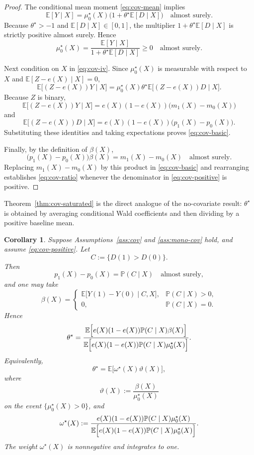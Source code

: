 \documentclass[11pt]{article}
\numberwithin{equation}{section}
\newcommand{\E}{\mathbb E}
\newcommand{\PP}{\mathbb P}
\newcommand{\1}{\mathbf 1}
\newtheorem{corollary}[assumption]{Corollary}
\theoremstyle{remark}
\begin{document}
\begin{proof}
The conditional mean moment \eqref{eq:cov-mean} implies
\[
\E[Y\mid X] = \mu_0^\star(X)\bigl(1+\theta^\star\E[D\mid X]\bigr)
\quad \text{almost surely}.
\]
Because $\theta^\star>-1$ and $\E[D\mid X]\in[0,1]$, the multiplier
$1+\theta^\star\E[D\mid X]$ is strictly positive almost surely. Hence
\[
\mu_0^\star(X)
= \frac{\E[Y\mid X]}{1+\theta^\star\E[D\mid X]} \ge 0
\quad \text{almost surely}.
\]

Next condition on $X$ in \eqref{eq:cov-iv}. Since $\mu_0^\star(X)$ is measurable with
respect to $X$ and $\E[Z-e(X)\mid X]=0$,
\[
\E\bigl[(Z-e(X))Y\mid X\bigr]
= \mu_0^\star(X)\theta^\star\E\bigl[(Z-e(X))D\mid X\bigr].
\]
Because $Z$ is binary,
\[
\E\bigl[(Z-e(X))Y\mid X\bigr] = e(X)(1-e(X))\bigl(m_1(X)-m_0(X)\bigr)
\]
and
\[
\E\bigl[(Z-e(X))D\mid X\bigr] = e(X)(1-e(X))\bigl(p_1(X)-p_0(X)\bigr).
\]
Substituting these identities and taking expectations proves \eqref{eq:cov-basic}.

Finally, by the definition of $\beta(X)$,
\[
\bigl(p_1(X)-p_0(X)\bigr)\beta(X) = m_1(X)-m_0(X)
\quad \text{almost surely}.
\]
Replacing $m_1(X)-m_0(X)$ by this product in \eqref{eq:cov-basic} and rearranging
establishes \eqref{eq:cov-ratio} whenever the denominator in
\eqref{eq:cov-positive} is positive.
\end{proof}

Theorem~\ref{thm:cov-saturated} is the direct analogue of the no-covariate result:
$\theta^\star$ is obtained by averaging conditional Wald coefficients and then dividing
by a positive baseline mean.

\begin{corollary}\label{cor:cov-late}
Suppose Assumptions~\ref{ass:cov} and \ref{ass:mono-cov} hold, and assume
\eqref{eq:cov-positive}. Let
\[
C := \{D(1)>D(0)\}.
\]
Then
\[
p_1(X)-p_0(X) = \PP(C\mid X)
\quad \text{almost surely},
\]
and one may take
\[
\beta(X) =
\begin{cases}
\E\bigl[Y(1)-Y(0)\mid C,X\bigr], & \PP(C\mid X)>0,\\[0.75ex]
0, & \PP(C\mid X)=0.
\end{cases}
\]
Hence
\begin{equation}\label{eq:cov-late-ratio}
\theta^\star
= \frac{\E\Bigl[e(X)(1-e(X))\PP(C\mid X)\beta(X)\Bigr]}
{\E\Bigl[e(X)(1-e(X))\PP(C\mid X)\mu_0^\star(X)\Bigr]}.
\end{equation}
Equivalently,
\begin{equation}\label{eq:cov-late-avg}
\theta^\star = \E\bigl[\omega^\star(X)\vartheta(X)\bigr],
\end{equation}
where
\[
\vartheta(X) := \frac{\beta(X)}{\mu_0^\star(X)}
\]
on the event $\{\mu_0^\star(X)>0\}$, and
\[
\omega^\star(X)
:= \frac{e(X)(1-e(X))\PP(C\mid X)\mu_0^\star(X)}
{\E\Bigl[e(X)(1-e(X))\PP(C\mid X)\mu_0^\star(X)\Bigr]}.
\]
The weight $\omega^\star(X)$ is nonnegative and integrates to one.
\end{corollary}
\end{document}
